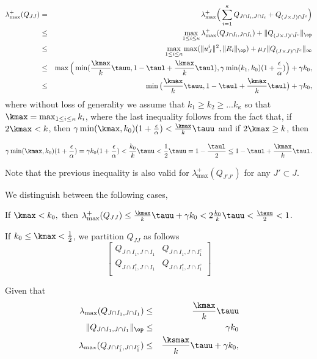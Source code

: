 \documentclass{article}
\begin{document}
\begin{eqnarray*}
\lambda_{\max}^+(Q_{JJ})&=&\lambda_{\max}^+ \Big (\sum_{i=1}^{\kappa} Q_{J \cap I_i, J \cap I_i} + Q_{(J \times J) \cap \bar{I}^c} \Big )\\
& \leq & \max_{1\leq i \leq \kappa} \lambda_{\max}^+(Q_{J \cap I_i, J \cap I_i}) + \|Q_{(J \times J) \cap \bar{I}^c}\|_{\op}\\
 & \leq & \max_{1\leq i \leq \kappa} \max(\|u^i_J\|^2,\|R_i\|_{\op})+\mu_J \|Q_{(J \times J) \cap \bar{I}^c}\|_{\infty}\\
 & \leq &  \max \Big (\min (\frac{\kmax}{k} \tauu, 1-\taul+\frac{\kmax}{k} \taul),\gamma \min(k_1,k_0) (1+\frac{\epsilon}{\alpha}) \Big )+\gamma k_0,\\
& \leq &  \min \big (\frac{\kmax}{k} \tauu, 1-\taul+\frac{\kmax}{k} \taul \big )+\gamma k_0,\\    
\end{eqnarray*}
where without loss of generality we assume that $k_1\geq k_2 \geq \ldots k_{\kappa}$ so that $\kmax=\max_{1\leq i \leq \kappa} k_i$, where the last inequality follows from the fact that, if $2\kmax < k$, then $\gamma \min(\kmax,k_0) (1+\frac{\epsilon}{\alpha}) < \frac{\kmax}{k} \tauu$ and if  $2\kmax \geq k$, then 

$$\gamma \min(\kmax,k_0) (1+\frac{\epsilon}{\alpha}) = \gamma k_0 (1+\frac{\epsilon}{\alpha}) <  \frac{k_0}{k} \tauu < \frac{1}{2}\tauu =1-\frac{\taul}{2}  \leq 1-\taul+\frac{\kmax}{k} \taul.$$

Note that the previous inequality is also valid for $\lambda_{\max}^+(Q_{J'\!J'})$ for any $J'\subset J$.

We distinguish between the following cases,

\BIT

\item If $\kmax < k_0,$ then $\lambda_{\max}^+(Q_{JJ}) \leq \frac{\kmax}{k} \tauu+\gamma k_0 < 2\frac{k_0}{k} \tauu < \frac{\tauu}{2} < 1$.

\item If $k_0\leq \kmax<\frac{1}{2}$, we partition $Q_{JJ}$ as follows
$$
\begin{bmatrix}
Q_{J \cap I_1,J \cap I_1} & Q_{J \cap I_1,J \cap I_1^c}\\
Q_{J \cap I_1^c,J \cap I_1} & Q_{J \cap I_1^c,J \cap I_1^c}\\
\end{bmatrix}
$$

Given that 
\begin{eqnarray*}
\lambda_{\max}(Q_{J \cap I_1,J \cap I_1}) & \leq & \frac{\kmax}{k} \tauu\\
\|Q_{J \cap I_1,J \cap I_1}\|_{\op} & \leq & \gamma k_0\\
\lambda_{\max}(Q_{J \cap I_1^c,J \cap I_1^c})  & \leq & \frac{\ksmax}{k}\tauu+\gamma k_0, 
\end{eqnarray*}
\end{document}
